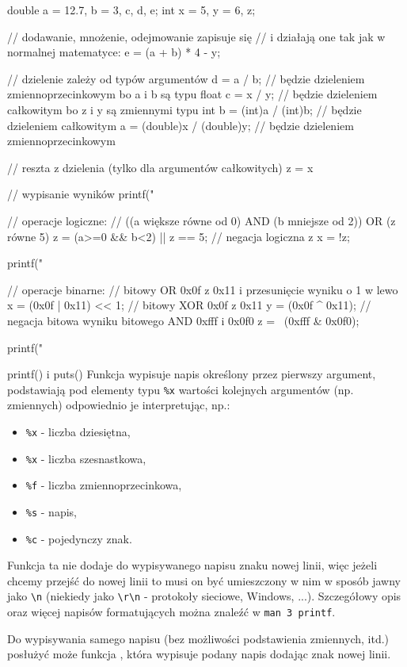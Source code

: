 \begin{CodeFrame*}[c]{}
double a = 12.7, b = 3, c, d, e;
int x = 5, y = 6, z;

// dodawanie, mnożenie, odejmowanie zapisuje się
// i działają one tak jak w normalnej matematyce:
e = (a + b) * 4 - y;

// dzielenie zależy od typów argumentów
d = a / b; // będzie dzieleniem zmiennoprzecinkowym bo a i b są typu float
c = x / y; // będzie dzieleniem całkowitym bo z i y są zmiennymi typu int
b = (int)a / (int)b; // będzie dzieleniem całkowitym
a = (double)x / (double)y; // będzie dzieleniem zmiennoprzecinkowym

// reszta z dzielenia (tylko dla argumentów całkowitych)
z = x %

// wypisanie wyników
printf("%

// operacje logiczne:
// ((a większe równe od 0) AND (b mniejsze od 2)) OR (z równe 5)
z = (a>=0 && b<2) || z == 5;
// negacja logiczna z
x = !z;

printf("%

// operacje binarne:
// bitowy OR 0x0f z 0x11 i przesunięcie wyniku o 1 w lewo
x = (0x0f | 0x11) << 1;
// bitowy XOR 0x0f z 0x11
y = (0x0f ^ 0x11);
// negacja bitowa wyniku bitowego AND 0xfff i 0x0f0
z = ~(0xfff & 0x0f0);

printf("%
\end{CodeFrame*}

\begin{ProTip}{printf() i puts()}
Funkcja  wypisuje napis określony przez pierwszy argument, podstawiają pod elementy typu \Verb#%
\begin{itemize}
	\item \Verb#%
	\item \Verb#%
	\item \Verb#%
	\item \Verb#%
	\item \Verb#%
\end{itemize}
Funkcja ta nie dodaje do wypisywanego napisu znaku nowej linii, więc jeżeli chcemy przejść do nowej linii to musi on być umieszczony w nim w sposób jawny jako \Verb#\n# (niekiedy jako \Verb#\r\n# - protokoły sieciowe, Windows, ...).
Szczegółowy opis  oraz więcej napisów formatujących można znaleźć w \Verb#man 3 printf#.

\vspace{8pt}
Do wypisywania samego napisu (bez możliwości podstawienia zmiennych, itd.) posłużyć może funkcja , która wypisuje podany napis dodając znak nowej linii.
\end{ProTip}


